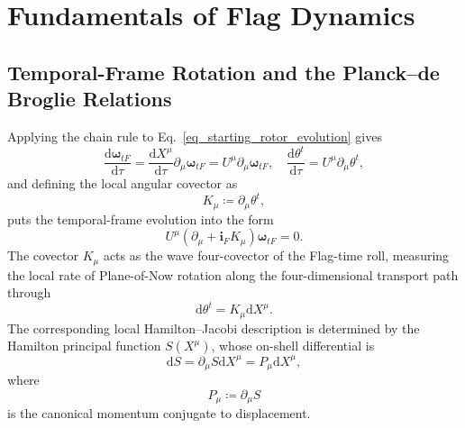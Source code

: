 
\section{Fundamentals of Flag Dynamics}\label{ch_EqOfMotion}
\subsection{Temporal-Frame Rotation and the Planck--de Broglie Relations}\label{ch_temporal_rotation_momentum}
Applying the chain rule to Eq.~\eqref{eq_starting_rotor_evolution} gives
\begin{equation}
    \frac{\mathrm{d}\boldsymbol{\omega}_{tF}}{\mathrm{d}\tau} = \frac{\mathrm{d}X^{\mu}}{\mathrm{d}\tau}\partial_{\mu}\boldsymbol{\omega}_{tF} = U^{\mu}\partial_{\mu}\boldsymbol{\omega}_{tF},\quad \frac{\mathrm{d}\theta^{t}}{\mathrm{d}\tau} = U^{\mu}\partial_{\mu}\theta^{t},
\end{equation}
and defining the local angular covector as
\begin{equation}
    K_{\mu} \coloneqq \partial_{\mu}\theta^{t},
\end{equation}
puts the temporal-frame evolution into the form
\begin{equation}\label{eq_parallel_transport}
    U^{\mu}\left(\partial_{\mu} + \mathbf{i}_{F}K_{\mu}\right)\boldsymbol{\omega}_{tF} = 0.
\end{equation}
The covector $K_{\mu}$ acts as the wave four-covector of the Flag-time roll, measuring the local rate of Plane-of-Now rotation along the four-dimensional transport path through
\begin{equation}\label{eq_flag_angle_differential}
    \mathrm{d}\theta^{t} = K_{\mu}\mathrm{d}X^{\mu}.
\end{equation}
The corresponding local Hamilton--Jacobi description is determined by the Hamilton principal function $S(X^{\mu})$, whose on-shell differential is
\begin{equation}\label{eq_action_differential}
    \mathrm{d}S = \partial_{\mu}S\mathrm{d}X^{\mu} = P_{\mu}\mathrm{d}X^{\mu},
\end{equation}
where
\begin{equation}\label{eq_def_canonical_momentum}
    P_{\mu} \coloneqq \partial_{\mu}S
\end{equation}
is the canonical momentum conjugate to displacement.

